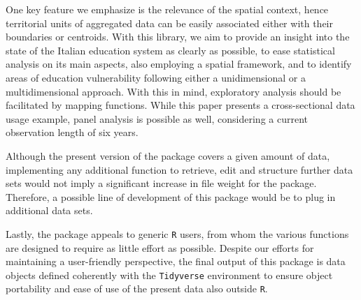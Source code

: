 \documentclass[openany]{book}
\begin{document}
One key feature we emphasize is the relevance of the spatial context, hence territorial units of aggregated data can be easily associated either with their boundaries or centroids. With this library, we aim to provide an insight into the state of the Italian education system as clearly as possible, to ease statistical analysis on its main aspects, also employing a spatial framework, and to identify areas of education vulnerability following either a unidimensional or a multidimensional approach. With this in mind, exploratory analysis should be facilitated by mapping functions. While this paper presents a cross-sectional data usage example, panel analysis is possible as well, considering a current observation length of six years. 

Although the present version of the package covers a given amount of data, implementing any additional function to retrieve, edit and structure further data sets would not imply a significant increase in file weight for the package. Therefore, a possible line of development of this package would be to plug in additional data sets.

Lastly, the package appeals to generic \texttt{R} users, from whom the various functions are designed to require as little effort as possible. Despite our efforts for maintaining a user-friendly perspective, the final output of this package is data objects defined coherently with the \texttt{Tidyverse} environment to ensure object portability and ease of use of the present data also outside \texttt{R}.
\end{document}
